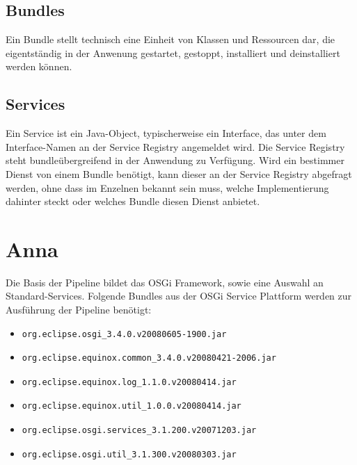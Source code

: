 \subsection{Bundles}
Ein Bundle stellt technisch eine Einheit von Klassen und Ressourcen dar, die
eigentständig in der Anwenung gestartet, gestoppt, installiert und
deinstalliert werden können.
\citep{wtherich_die_2008}

\subsection{Services} %
Ein Service ist ein Java-Object, typischerweise ein Interface, das unter dem
Interface-Namen an der Service Registry angemeldet wird.
Die Service Registry steht bundleübergreifend in der Anwendung zu Verfügung.
Wird ein bestimmer Dienst von einem Bundle benötigt, kann dieser an der Service
Registry abgefragt werden, ohne dass im Enzelnen bekannt sein muss, welche
Implementierung dahinter steckt oder welches Bundle diesen Dienst anbietet.
\citep{wtherich_die_2008}
\section{Anna}
Die Basis der Pipeline bildet das OSGi Framework, sowie
eine Auswahl an Standard-Services.
Folgende Bundles aus der OSGi Service Plattform werden zur Ausführung der
Pipeline benötigt:
\begin{itemize}
  \item
  \begin{verbatim}org.eclipse.osgi_3.4.0.v20080605-1900.jar\end{verbatim}
  \item
  \begin{verbatim}org.eclipse.equinox.common_3.4.0.v20080421-2006.jar\end{verbatim}
  \item
  \begin{verbatim}org.eclipse.equinox.log_1.1.0.v20080414.jar\end{verbatim}
  \item
  \begin{verbatim}org.eclipse.equinox.util_1.0.0.v20080414.jar\end{verbatim}
  \item
  \begin{verbatim}org.eclipse.osgi.services_3.1.200.v20071203.jar\end{verbatim}
  \item
  \begin{verbatim}org.eclipse.osgi.util_3.1.300.v20080303.jar\end{verbatim}
\end{itemize}

